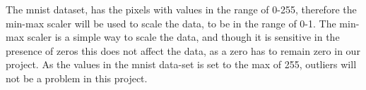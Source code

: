 The \gls{mnist} dataset, has the pixels with values in the range of 0-255, therefore the min-max scaler will be used to scale the data, to be in the range of 0-1. The min-max scaler is a simple way to scale the data, and though it is sensitive in the presence of zeros this does not affect the data, as a zero has to remain zero in our project. As the values in the \gls{mnist} data-set is set to the max of 255, outliers will not be a problem in this project.